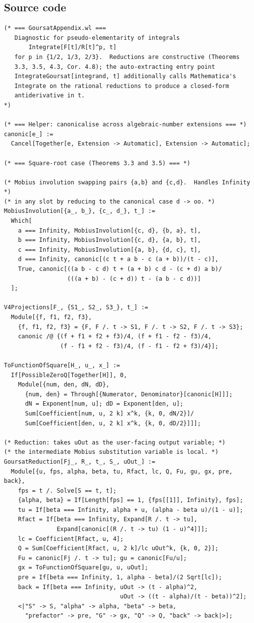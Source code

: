 \documentclass[11pt,a4paper]{article}
\theoremstyle{plain}
\theoremstyle{definition}
\theoremstyle{remark}
\begin{document}
\subsection*{Source code}

\begin{lstlisting}
(* === GoursatAppendix.wl ===
   Diagnostic for pseudo-elementarity of integrals
       Integrate[F[t]/R[t]^p, t]
   for p in {1/2, 1/3, 2/3}.  Reductions are constructive (Theorems
   3.3, 3.5, 4.3, Cor. 4.8); the auto-extracting entry point
   IntegrateGoursat[integrand, t] additionally calls Mathematica's
   Integrate on the rational reductions to produce a closed-form
   antiderivative in t.
*)

(* === Helper: canonicalise across algebraic-number extensions === *)
canonic[e_] :=
  Cancel[Together[e, Extension -> Automatic], Extension -> Automatic];

(* === Square-root case (Theorems 3.3 and 3.5) === *)

(* Mobius involution swapping pairs {a,b} and {c,d}.  Handles Infinity *)
(* in any slot by reducing to the canonical case d -> oo. *)
MobiusInvolution[{a_, b_}, {c_, d_}, t_] :=
  Which[
    a === Infinity, MobiusInvolution[{c, d}, {b, a}, t],
    b === Infinity, MobiusInvolution[{c, d}, {a, b}, t],
    c === Infinity, MobiusInvolution[{a, b}, {d, c}, t],
    d === Infinity, canonic[(c t + a b - c (a + b))/(t - c)],
    True, canonic[((a b - c d) t + (a + b) c d - (c + d) a b)/
                  (((a + b) - (c + d)) t - (a b - c d))]
  ];

V4Projections[F_, {S1_, S2_, S3_}, t_] :=
  Module[{f, f1, f2, f3},
    {f, f1, f2, f3} = {F, F /. t -> S1, F /. t -> S2, F /. t -> S3};
    canonic /@ {(f + f1 + f2 + f3)/4, (f + f1 - f2 - f3)/4,
                (f - f1 + f2 - f3)/4, (f - f1 - f2 + f3)/4}];

ToFunctionOfSquare[H_, u_, x_] :=
  If[PossibleZeroQ[Together[H]], 0,
    Module[{num, den, dN, dD},
      {num, den} = Through[{Numerator, Denominator}[canonic[H]]];
      dN = Exponent[num, u]; dD = Exponent[den, u];
      Sum[Coefficient[num, u, 2 k] x^k, {k, 0, dN/2}]/
      Sum[Coefficient[den, u, 2 k] x^k, {k, 0, dD/2}]]];

(* Reduction: takes uOut as the user-facing output variable; *)
(* the intermediate Mobius substitution variable is local. *)
GoursatReduction[Fj_, R_, t_, S_, uOut_] :=
  Module[{u, fps, alpha, beta, tu, Rfact, lc, Q, Fu, gu, gx, pre, back},
    fps = t /. Solve[S == t, t];
    {alpha, beta} = If[Length[fps] == 1, {fps[[1]], Infinity}, fps];
    tu = If[beta === Infinity, alpha + u, (alpha - beta u)/(1 - u)];
    Rfact = If[beta === Infinity, Expand[R /. t -> tu],
               Expand[canonic[(R /. t -> tu) (1 - u)^4]]];
    lc = Coefficient[Rfact, u, 4];
    Q = Sum[Coefficient[Rfact, u, 2 k]/lc uOut^k, {k, 0, 2}];
    Fu = canonic[Fj /. t -> tu]; gu = canonic[Fu/u];
    gx = ToFunctionOfSquare[gu, u, uOut];
    pre = If[beta === Infinity, 1, alpha - beta]/(2 Sqrt[lc]);
    back = If[beta === Infinity, uOut -> (t - alpha)^2,
                                 uOut -> ((t - alpha)/(t - beta))^2];
    <|"S" -> S, "alpha" -> alpha, "beta" -> beta,
      "prefactor" -> pre, "G" -> gx, "Q" -> Q, "back" -> back|>];


\end{lstlisting}
\end{document}
